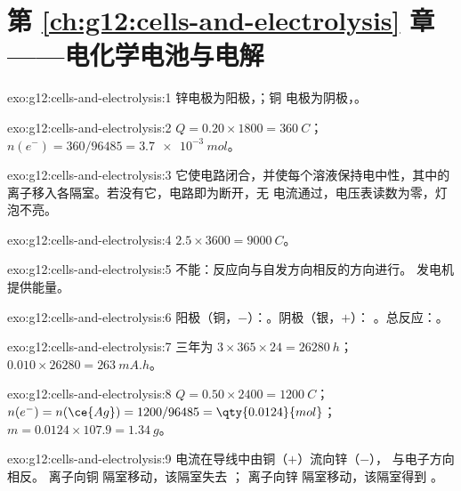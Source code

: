 \section*{第 \ref{ch:g12:cells-and-electrolysis} 章——电化学电池与电解}

\begin{solution}{exo:g12:cells-and-electrolysis:1}
锌电极为阳极，；铜
电极为阴极，。
\end{solution}

\begin{solution}{exo:g12:cells-and-electrolysis:2}
$Q = 0.20 \times 1800 = \qty{360}{C}$；$n(e^-) = 360/96485 =
\qty{3.7e-3}{mol}$。
\end{solution}

\begin{solution}{exo:g12:cells-and-electrolysis:3}
它使电路闭合，并使每个溶液保持电中性，其中的
离子移入各隔室。若没有它，电路即为断开，无
电流通过，电压表读数为零，灯泡不亮。
\end{solution}

\begin{solution}{exo:g12:cells-and-electrolysis:4}
$2.5 \times 3600 = \qty{9000}{C}$。
\end{solution}

\begin{solution}{exo:g12:cells-and-electrolysis:5}
不能：反应向与自发方向相反的方向进行。
发电机提供能量。
\end{solution}

\begin{solution}{exo:g12:cells-and-electrolysis:6}
阳极（铜，$-$）：。阴极（银，$+$）：
。总反应：。
\end{solution}

\begin{solution}{exo:g12:cells-and-electrolysis:7}
三年为 $3 \times 365 \times 24 = \qty{26280}{h}$；
$0.010 \times 26280 = \qty{263}{mA.h}$。
\end{solution}

\begin{solution}{exo:g12:cells-and-electrolysis:8}
$Q = 0.50 \times 2400 = \qty{1200}{C}$；$n(e^-) = n(\ce{Ag}) =
1200/96485 = \qty{0.0124}{mol}$；$m = 0.0124 \times 107.9 =
\qty{1.34}{g}$。
\end{solution}

\begin{solution}{exo:g12:cells-and-electrolysis:9}
电流在导线中由铜（$+$）流向锌（$-$），
与电子方向相反。 离子向铜
隔室移动，该隔室失去 ； 离子向锌
隔室移动，该隔室得到 。
\end{solution}

